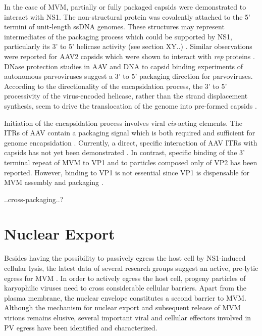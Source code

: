 In the case of MVM, partially or fully packaged capsids were demonstrated to interact with NS1. The non-structural protein was covalently attached to the 5' termini of unit-length ssDNA genomes. These structures may represent intermediates of the packaging process which could be supported by NS1, particularly its 3' to 5' helicase activity (see section XY..) \cite{pmid2527311}. Similar observations were reported for AAV2 capsids which were shown to interact with \textit{rep} proteins \cite{pmid8553536, pmid8995658}. DNase protection studies in AAV \cite{pmid11406604} and DNA to capsid binding experiments of autonomous parvoviruses \cite{pmid2145445, pmid8350419} suggest a 3’ to 5’ packaging direction for parvoviruses. According to the directionality of the encapsidation process, the 3’ to 5’ processivity of the virus-encoded helicase, rather than the strand displacement synthesis, seem to drive the translocation of the genome into pre-formed capsids \cite{pmid11406604}. 

Initiation of the encapsidation process involves viral \textit{cis}-acting elements. The ITRs of AAV contain a packaging signal which is both required and sufficient for genome encapsidation \cite{pmid2547998}. Currently, a direct, specific interaction of AAV ITRs with capsids has not yet been demonstrated \cite{pmid8627687, pmid9060669}. In contrast, specific binding of the 3' terminal repeat of MVM to VP1 \cite{pmid1870193} and to particles composed only of VP2 \cite{pmid8350419} has been reported. However, binding to VP1 is not essential since VP1 is dispensable for MVM assembly and packaging \cite{pmid8416366}.      
      

..cross-packaging..?

\section{Nuclear Export}

Besides having the possibility to passively egress the host cell by NS1-induced cellular lysis, the latest data of several research groups suggest an active, pre-lytic egress for MVM \cite{pmid24068925, pmid18704167, pmid15367635}. In order to actively egress the host cell, progeny particles of karyophilic viruses need to cross considerable cellular barriers. Apart from the plasma membrane, the nuclear envelope constitutes a second barrier to MVM. Although the mechanism for nuclear export and subsequent release of MVM virions remains elusive, several important viral and cellular effectors involved in PV egress have been identified and characterized. 

